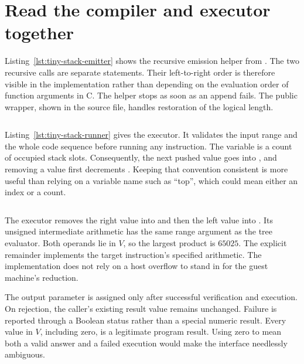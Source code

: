 \section{Read the compiler and executor together}
\label{sec:tiny-stack-c-implementation}

Listing~\ref{lst:tiny-stack-emitter} shows the recursive emission helper from .
The two recursive calls are separate statements.
Their left-to-right order is therefore visible in the implementation rather than depending on the evaluation order of function arguments in C.
The helper stops as soon as an append fails.
The public wrapper, shown in the source file, handles restoration of the logical length.

\begin{listing}
  \inputminted[firstline=13,lastline=25]{c}{example-code/ch01/stack.c}
  \caption{Emission follows the source tree while appending target instructions.}
  \label{lst:tiny-stack-emitter}
\end{listing}

Listing~\ref{lst:tiny-stack-runner} gives the executor.
It validates the input range and the whole code sequence before running any instruction.
The variable  is a count of occupied stack slots.
Consequently, the next pushed value goes into , and removing a value first decrements .
Keeping that convention consistent is more useful than relying on a variable name such as \enquote{top}, which could mean either an index or a count.

\begin{listing}
  \inputminted[firstline=66,lastline=85]{c}{example-code/ch01/stack.c}
  \caption{The executor runs verified code and publishes one result on success.}
  \label{lst:tiny-stack-runner}
\end{listing}

The executor removes the right value into  and then the left value into .
Its unsigned intermediate arithmetic has the same range argument as the tree evaluator.
Both operands lie in $V$, so the largest product is $65025$.
The explicit remainder implements the target instruction's specified arithmetic.
The implementation does not rely on a host overflow to stand in for the guest machine's reduction.

The output parameter is assigned only after successful verification and execution.
On rejection, the caller's existing result value remains unchanged.
Failure is reported through a Boolean status rather than a special numeric result.
Every value in $V$, including zero, is a legitimate program result.
Using zero to mean both a valid answer and a failed execution would make the interface needlessly ambiguous.

